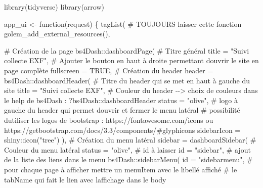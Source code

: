 \documentclass[
  letterpaper,
  DIV=11,
  numbers=noendperiod]{scrreprt}
\newenvironment{Shaded}{\begin{snugshade}}{\end{snugshade}}
\newcommand{\AttributeTok}[1]{\textcolor[rgb]{0.40,0.45,0.13}{#1}}
\newcommand{\CommentTok}[1]{\textcolor[rgb]{0.37,0.37,0.37}{#1}}
\newcommand{\ConstantTok}[1]{\textcolor[rgb]{0.56,0.35,0.01}{#1}}
\newcommand{\ControlFlowTok}[1]{\textcolor[rgb]{0.00,0.23,0.31}{#1}}
\newcommand{\FunctionTok}[1]{\textcolor[rgb]{0.28,0.35,0.67}{#1}}
\newcommand{\NormalTok}[1]{\textcolor[rgb]{0.00,0.23,0.31}{#1}}
\newcommand{\OtherTok}[1]{\textcolor[rgb]{0.00,0.23,0.31}{#1}}
\newcommand{\SpecialCharTok}[1]{\textcolor[rgb]{0.37,0.37,0.37}{#1}}
\newcommand{\StringTok}[1]{\textcolor[rgb]{0.13,0.47,0.30}{#1}}
\begin{document}
\begin{Shaded}
\begin{Highlighting}[]
\FunctionTok{library}\NormalTok{(tidyverse)}
\FunctionTok{library}\NormalTok{(arrow)}

\NormalTok{app\_ui }\OtherTok{\textless{}{-}} \ControlFlowTok{function}\NormalTok{(request) \{}
  \FunctionTok{tagList}\NormalTok{(}
    \CommentTok{\# TOUJOURS laisser cette fonction}
    \FunctionTok{golem\_add\_external\_resources}\NormalTok{(),}
    
    \CommentTok{\# Création de la page}
\NormalTok{    bs4Dash}\SpecialCharTok{::}\FunctionTok{dashboardPage}\NormalTok{(}
      \CommentTok{\# Titre général}
      \AttributeTok{title =} \StringTok{"Suivi collecte EXF"}\NormalTok{,}
      \CommentTok{\# Ajouter le bouton en haut à droite permettant d\textquotesingle{}ouvrir le site en page complète}
      \AttributeTok{fullscreen =} \ConstantTok{TRUE}\NormalTok{,}
      \CommentTok{\# Création du header}
      \AttributeTok{header =}\NormalTok{ bs4Dash}\SpecialCharTok{::}\FunctionTok{dashboardHeader}\NormalTok{(}
        \CommentTok{\# Titre du header qui se met en haut à gauche du site}
        \AttributeTok{title =} \StringTok{"Suivi collecte EXF"}\NormalTok{,}
        \CommentTok{\# Couleur du header {-}{-}\textgreater{} choix de couleurs dans le help de bs4Dash : ?bs4Dash::dashboardHeader}
        \AttributeTok{status =} \StringTok{"olive"}\NormalTok{,}
        \CommentTok{\# logo à gauche du header qui permet d\textquotesingle{}ouvrir et fermer le menu latéral}
        \CommentTok{\# possibilité d\textquotesingle{}utiliser les logos de bootstrap : https://fontawesome.com/icons ou https://getbootstrap.com/docs/3.3/components/\#glyphicons}
        \AttributeTok{sidebarIcon =}\NormalTok{ shiny}\SpecialCharTok{::}\FunctionTok{icon}\NormalTok{(}\StringTok{"tree"}\NormalTok{)}
\NormalTok{      ),}
      \CommentTok{\# Création du menu latéral}
      \AttributeTok{sidebar =} \FunctionTok{dashboardSidebar}\NormalTok{(}
        \CommentTok{\# Couleur du menu latéral}
        \AttributeTok{status =} \StringTok{"olive"}\NormalTok{,}
        \CommentTok{\# id à laisser}
        \AttributeTok{id =} \StringTok{"sidebar"}\NormalTok{,}
        \CommentTok{\# ajout de la liste des liens dans le menu}
\NormalTok{        bs4Dash}\SpecialCharTok{::}\FunctionTok{sidebarMenu}\NormalTok{(}
          \AttributeTok{id =} \StringTok{"sidebarmenu"}\NormalTok{,}
          \CommentTok{\# pour chaque page à afficher mettre un menuItem avec le libellé affiché}
          \CommentTok{\# le tabName qui fait le lien avec l\textquotesingle{}affichage dans le body}

\end{Highlighting}
\end{Shaded}
\end{document}
